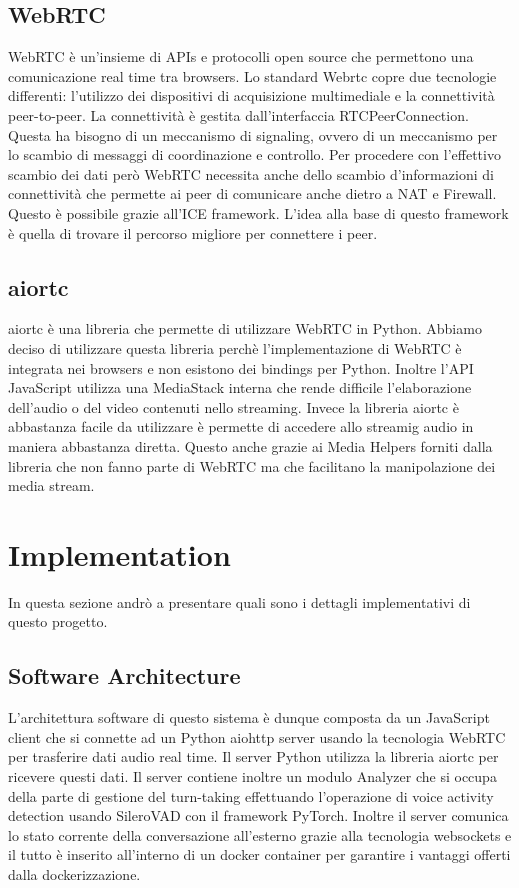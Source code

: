 \documentclass[12pt]{article}
\begin{document}
\subsection{WebRTC}

WebRTC è un'insieme di APIs e protocolli open source che permettono una comunicazione real time tra browsers. Lo standard Webrtc copre due tecnologie differenti: l'utilizzo dei dispositivi di acquisizione multimediale e la connettività peer-to-peer. La connettività è gestita dall'interfaccia RTCPeerConnection. Questa ha bisogno di un meccanismo di signaling, ovvero di un meccanismo per lo scambio di messaggi di coordinazione e controllo.
Per procedere con l'effettivo scambio dei dati però WebRTC necessita anche dello scambio d'informazioni di connettività che permette ai peer di comunicare anche dietro a NAT e Firewall. Questo è possibile grazie all'ICE framework. L'idea alla base di questo framework è quella di trovare il percorso migliore per connettere i peer.

\subsection{aiortc}

aiortc è una libreria che permette di utilizzare WebRTC in Python.
Abbiamo deciso di utilizzare questa libreria perchè l'implementazione di WebRTC è integrata nei browsers e non esistono dei bindings per Python. Inoltre l'API JavaScript utilizza una MediaStack interna che rende difficile l'elaborazione dell'audio o del video contenuti nello streaming. Invece la libreria aiortc è abbastanza facile da utilizzare è permette di accedere allo streamig audio in maniera abbastanza diretta. Questo anche grazie ai Media Helpers forniti dalla libreria che non fanno parte di WebRTC ma che facilitano la manipolazione dei media stream.

\section{Implementation}

In questa sezione andrò a presentare quali sono i dettagli implementativi di questo progetto.

\subsection{Software Architecture}

L'architettura software di questo sistema è dunque composta da un JavaScript client che si connette ad un Python aiohttp server usando la tecnologia WebRTC per trasferire dati audio real time. Il server Python utilizza la libreria aiortc per ricevere questi dati. Il server contiene inoltre un modulo Analyzer che si occupa della parte di gestione del turn-taking effettuando l'operazione di voice activity detection usando SileroVAD con il framework PyTorch. Inoltre il server comunica lo stato corrente della conversazione all'esterno grazie alla tecnologia websockets e il tutto è inserito all'interno di un docker container per garantire i vantaggi offerti dalla dockerizzazione.
\end{document}
